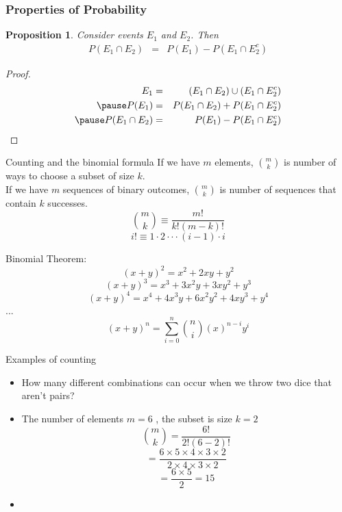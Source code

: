 \documentclass{beamer}
\newtheorem{prop}{Proposition}
\numberwithin{equation}{section}
\begin{document}
\begin{frame}
\frametitle{Properties of Probability} 
\begin{prop}
Consider events $E_{1}$ and $E_{2}$.  Then 
\begin{eqnarray}
P(E_{1} \cap E_{2} ) & = & P(E_{1} ) - P(E_{1} \cap E_{2}^{c}) \nonumber 
\end{eqnarray}
\end{prop}

\pause 
\begin{proof}
\begin{eqnarray}
E_{1} & = & (E_{1} \cap E_{2}) \cup (E_{1} \cap E_{2}^{c}) \nonumber \\ \pause 
P(E_{1}) & = & P(E_{1} \cap E_{2} )  + P(E_{1} \cap E_{2}^{c} ) \nonumber \\  \pause 
P(E_{1} \cap E_{2} ) & = &  P(E_{1} ) - P(E_{1} \cap E_{2}^{c} ) \nonumber  
\end{eqnarray}




\end{proof}


\end{frame}


\begin{frame}{Counting and the binomial formula}
If we have $m$ elements, ${{m}\choose{k}}$ is number of ways to choose a subset of size $k$.\\
If we have $m$ sequences of binary outcomes, ${{m}\choose{k}}$ is number of sequences that contain $k$ successes.\\
$${{m}\choose{k}}\equiv\frac{m!}{k!(m-k)!}$$
$$i!\equiv1\cdot2\cdot\cdot\cdot(i-1)\cdot i$$

\pause
Binomial Theorem: 
$$(x+y)^2= x^2+2xy+y^2$$
$$(x+y)^3= x^3+3x^2y+3xy^2+y^3$$
$$(x+y)^4= x^4+4x^3y+6x^2y^2+4xy^3+y^4$$
$...$
$$(x+ y)^{n} = \sum_{i=0}^{n} {{n}\choose {i}} (x)^{n- i} y^{i} $$
\end{frame}



\begin{frame}{Examples of counting}
\begin{itemize}
\item How many different combinations can occur when we throw two dice that aren't pairs?
\item The number of elements $m = 6$ , the subset is size $k=2$\pause
$${{m}\choose{k}}=\frac{6!}{2!(6-2)!}$$\pause
$$=\frac{6\times5\times4\times3\times2}{2\times4\times3\times2}$$
$$=\frac{6\times5}{2}=15$$
\item 
\end{itemize}
\end{frame}
\end{document}
